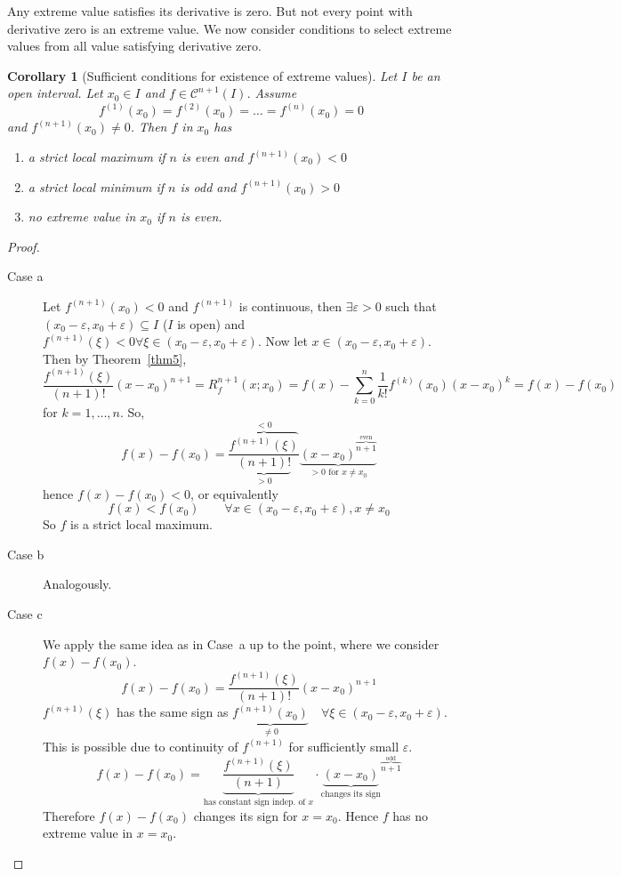 \documentclass{article}
\newtheorem*{corollary}{Corollary}%
\begin{document}
Any extreme value satisfies its derivative is zero. But not every point with derivative zero is an extreme value.
We now consider conditions to select extreme values from all value satisfying derivative zero.

\begin{corollary}[Sufficient conditions for existence of extreme values]
  Let $I$ be an open interval. Let $x_0 \in I$ and $f \in \mathcal C^{n+1}(I)$. Assume
  \[ f^{(1)}(x_0) = f^{(2)}(x_0) = \dots = f^{(n)}(x_0) = 0 \] %
  and $f^{(n+1)}(x_0) \neq 0$. Then $f$ in $x_0$ has
  \begin{enumerate}
    \item a strict local maximum if $n$ is even and $f^{(n+1)}(x_0) < 0$
    \item a strict local minimum if $n$ is odd and $f^{(n+1)}(x_0) > 0$
    \item no extreme value in $x_0$ if $n$ is even.
  \end{enumerate}
\end{corollary}

\begin{proof}
  \begin{description}
    \item[Case a]
      Let $f^{(n+1)}(x_0) < 0$ and $f^{(n+1)}$ is continuous,
      then $\exists \varepsilon > 0$ such that $(x_0 - \varepsilon, x_0 + \varepsilon) \subseteq I$ ($I$ is open)
      and $f^{(n+1)}(\xi) < 0 \forall \xi \in (x_0 - \varepsilon, x_0 + \varepsilon)$.
      Now let $x \in (x_0 - \varepsilon, x_0 + \varepsilon)$.
      Then by Theorem~\ref{thm5},
      \[ \frac{f^{(n+1)}(\xi)}{(n+1)!} (x - x_0)^{n+1} = R_f^{n+1}(x; x_0) = f(x) - \sum_{k=0}^n \frac{1}{k!} f^{(k)}(x_0) (x - x_0)^k = f(x) - f(x_0) \]
      for $k = 1, \dots, n$. So,
      \[ f(x) - f(x_0) = \frac{\overbrace{f^{(n+1)}(\xi)}^{< 0}}{\underbrace{(n+1)!}_{> 0}} \underbrace{(x - x_0)^{\overbrace{n+1}^{\text{even}}}}_{> 0 \text{ for } x \neq x_0} \]
      hence $f(x) - f(x_0) < 0$, or equivalently
      \[ f(x) < f(x_0) \qquad \forall x \in (x_0 - \varepsilon, x_0 + \varepsilon), x \neq x_0 \]
      So $f$ is a strict local maximum.
    \item[Case b] Analogously.
    \item[Case c] We apply the same idea as in Case~a up to the point, where we consider $f(x) - f(x_0)$.
      \[ f(x) - f(x_0) = \frac{f^{(n+1)}(\xi)}{(n+1)!} (x - x_0)^{n+1} \]
      $f^{(n+1)}(\xi)$ has the same sign as $\underbrace{f^{(n+1)}(x_0)}_{\neq 0} \quad \forall \xi \in (x_0 - \varepsilon, x_0 + \varepsilon)$.
      This is possible due to continuity of $f^{(n+1)}$ for sufficiently small $\varepsilon$.
      \[
        f(x) - f(x_0)
        = \underbrace{\frac{f^{(n+1)}(\xi)}{(n+1)}}_{\text{has constant sign indep. of } x} \cdot {\underbrace{(x - x_0)}_{\text{changes its sign}}}^{\overbrace{n+1}^{\text{odd}}}
      \]
      Therefore $f(x) - f(x_0)$ changes its sign for $x = x_0$. Hence $f$ has no extreme value in $x = x_0$.
  \end{description}
\end{proof}
\end{document}
